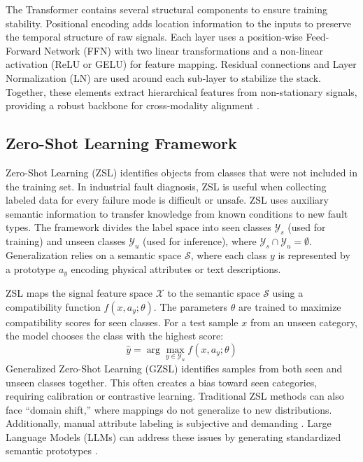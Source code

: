 \documentclass[journal]{IEEEtran}
\begin{document}
The Transformer contains several structural components to ensure training stability. Positional encoding adds location information to the inputs to preserve the temporal structure of raw signals. Each layer uses a position-wise Feed-Forward Network (FFN) with two linear transformations and a non-linear activation (ReLU or GELU) for feature mapping. Residual connections and Layer Normalization (LN) are used around each sub-layer to stabilize the stack. Together, these elements extract hierarchical features from non-stationary signals, providing a robust backbone for cross-modality alignment \cite{vaswani2017attention}.

\subsection{Zero-Shot Learning Framework}

Zero-Shot Learning (ZSL) identifies objects from classes that were not included in the training set. In industrial fault diagnosis, ZSL is useful when collecting labeled data for every failure mode is difficult or unsafe. ZSL uses auxiliary semantic information to transfer knowledge from known conditions to new fault types. The framework divides the label space into seen classes $\mathcal{Y}_s$ (used for training) and unseen classes $\mathcal{Y}_u$ (used for inference), where $\mathcal{Y}_s \cap \mathcal{Y}_u = \emptyset$. Generalization relies on a semantic space $\mathcal{S}$, where each class $y$ is represented by a prototype $a_y$ encoding physical attributes or text descriptions.

ZSL maps the signal feature space $\mathcal{X}$ to the semantic space $\mathcal{S}$ using a compatibility function $f(x, a_y; \theta)$. The parameters $\theta$ are trained to maximize compatibility scores for seen classes. For a test sample $x$ from an unseen category, the model chooses the class with the highest score:
\begin{equation}
\hat{y} = \arg\max_{y \in \mathcal{Y}_u} f(x, a_y; \theta)
\end{equation}
Generalized Zero-Shot Learning (GZSL) identifies samples from both seen and unseen classes together. This often creates a bias toward seen categories, requiring calibration or contrastive learning. Traditional ZSL methods can also face ``domain shift,'' where mappings do not generalize to new distributions. Additionally, manual attribute labeling is subjective and demanding \cite{palatucci2009zero, lampert2009learning}. Large Language Models (LLMs) can address these issues by generating standardized semantic prototypes \cite{xian2018zero}.
\end{document}

